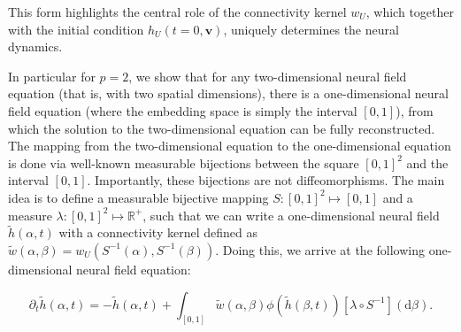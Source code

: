 \documentclass[10pt,letterpaper]{article}
\def\d{\mathrm d}
\renewcommand{\vec}[1]{\boldsymbol{#1}}
\begin{document}
This form highlights the central role of the connectivity kernel $w_U$, which together with the initial condition $h_U(t=0, \vec v)$, uniquely determines the neural dynamics.


In particular for $p=2$, we show that for any two-dimensional neural field equation (that is, with two spatial dimensions), there is a one-dimensional neural field equation (where the embedding space is simply the interval $[0,1]$), from which the solution to the two-dimensional equation can be fully reconstructed. The mapping from the two-dimensional equation to the one-dimensional equation is done via well-known measurable bijections between the square $[0,1]^2$ and the interval $[0,1]$. Importantly, these bijections are not diffeomorphisms.
The main idea is to define a measurable bijective mapping $S : [0,1]^2 \mapsto [0,1]$ and a measure $\lambda : [0,1]^2 \mapsto \mathbb{R}^+$, such that we can write a one-dimensional neural field	$\tilde h(\alpha, t)$ with a connectivity kernel defined as $\tilde w(\alpha, \beta) = w_U(S^{-1}(\alpha), S^{-1}(\beta))$. Doing this, we arrive at the following one-dimensional neural field equation: 

\begin{equation} \label{eq:nf-in-01}
\partial_t \tilde h(\alpha, t) = -\tilde h(\alpha, t) + \int_{[0,1]} \tilde w(\alpha, \beta) \phi(\tilde h(\beta, t)) \left[\lambda \circ S^{-1}\right](\d \beta).
\end{equation}
\end{document}
